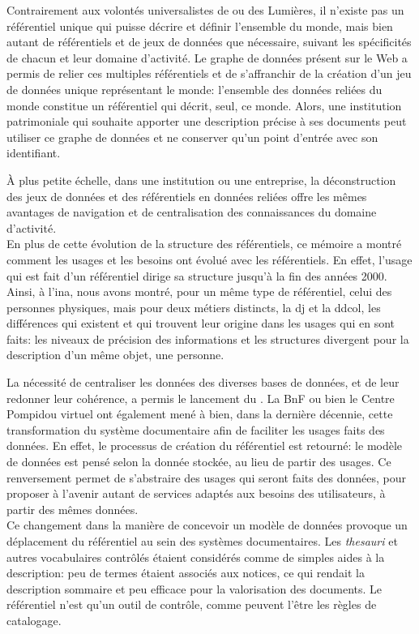 \noindent Contrairement aux volontés universalistes de  ou des Lumières, il n'existe pas un référentiel unique qui puisse décrire et définir l'ensemble du monde, mais bien autant de référentiels et de jeux de données que nécessaire, suivant les spécificités de chacun et leur domaine d'activité. Le graphe de données présent sur le Web a permis de relier ces multiples référentiels et de s'affranchir de la création d'un jeu de données unique représentant le monde: l'ensemble des données reliées du monde constitue un référentiel qui décrit, seul, ce monde. Alors, une institution patrimoniale qui souhaite apporter une description précise à ses documents peut utiliser ce graphe de données et ne conserver qu'un point d'entrée avec son identifiant.

\noindent À plus petite échelle, dans une institution ou une entreprise, la déconstruction des jeux de données et des référentiels en données reliées offre les mêmes avantages de navigation et de centralisation des connaissances du domaine d'activité.\\

En plus de cette évolution de la structure des référentiels, ce mémoire a montré comment les usages et les besoins ont évolué avec les référentiels. En effet, l'usage qui est fait d'un référentiel dirige sa structure jusqu'à la fin des années 2000. Ainsi, à l'\ac{ina}, nous avons montré, pour un même type de référentiel, celui des personnes physiques, mais pour deux métiers distincts, la \ac*{dj} et la \ac*{ddcol}, les différences qui existent et qui trouvent leur origine dans les usages qui en sont faits: les niveaux de précision des informations et les structures divergent pour la description d'un même objet, une personne.

\noindent La nécessité de centraliser les données des diverses bases de données, et de leur redonner leur cohérence, a permis le lancement du \ldd. La BnF ou bien le Centre Pompidou virtuel ont également mené à bien, dans la dernière décennie, cette transformation du système documentaire afin de faciliter les usages faits des données. En effet, le processus de création du référentiel est retourné: le modèle de données est pensé selon la donnée stockée, au lieu de partir des usages. Ce renversement permet de s'abstraire des usages qui seront faits des données, pour proposer à l'avenir autant de services adaptés aux besoins des utilisateurs, à partir des mêmes données.\\

Ce changement dans la manière de concevoir un modèle de données provoque un déplacement du référentiel au sein des systèmes documentaires. Les \textit{thesauri} et autres vocabulaires contrôlés étaient considérés comme de simples aides à la description: peu de termes étaient associés aux notices, ce qui rendait la description sommaire et peu efficace pour la valorisation des documents. Le référentiel n'est qu'un outil de contrôle, comme peuvent l'être les règles de catalogage.

